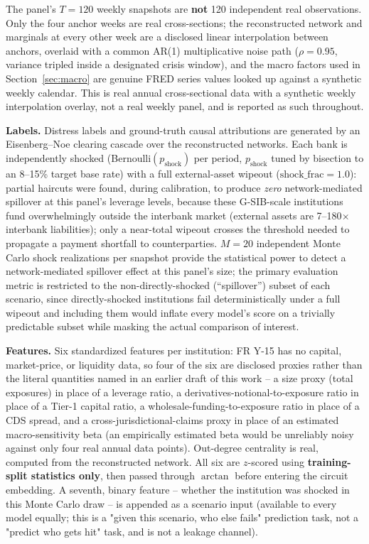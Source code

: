 \documentclass[journal]{IEEEtran}
\begin{document}
The panel's $T=120$ weekly snapshots are \textbf{not} 120 independent
real observations. Only the four anchor weeks are real cross-sections;
the reconstructed network and marginals at every other week are a
disclosed linear interpolation between anchors, overlaid with a common
AR(1) multiplicative noise path ($\rho=0.95$, variance tripled inside a
designated crisis window), and the macro factors used in
Section~\ref{sec:macro} are genuine FRED series values looked up against
a synthetic weekly calendar. This is real annual cross-sectional data
with a synthetic weekly interpolation overlay, not a real weekly panel,
and is reported as such throughout.

\textbf{Labels.} Distress labels and ground-truth causal attributions
are generated by an Eisenberg--Noe \cite{eisenberg2001} clearing cascade
over the reconstructed networks. Each bank is independently shocked
(Bernoulli$(p_{\mathrm{shock}})$ per period, $p_{\mathrm{shock}}$ tuned
by bisection to an 8--15\% target base rate) with a full external-asset
wipeout ($\mathrm{shock\_frac}=1.0$): partial haircuts were found, during
calibration, to produce \emph{zero} network-mediated spillover at this
panel's leverage levels, because these G-SIB-scale institutions fund
overwhelmingly outside the interbank market (external assets are
7--180$\times$ interbank liabilities); only a near-total wipeout crosses
the threshold needed to propagate a payment shortfall to counterparties.
$M=20$ independent Monte Carlo shock realizations per snapshot provide
the statistical power to detect a network-mediated spillover effect at
this panel's size; the primary evaluation metric is restricted to the
non-directly-shocked (``spillover'') subset of each scenario, since
directly-shocked institutions fail deterministically under a full
wipeout and including them would inflate every model's score on a
trivially predictable subset while masking the actual comparison of
interest.

\textbf{Features.} Six standardized features per institution: FR Y-15
has no capital, market-price, or liquidity data, so four of the six are
disclosed proxies rather than the literal quantities named in an earlier
draft of this work -- a size proxy (total exposures) in place of a
leverage ratio, a derivatives-notional-to-exposure ratio in place of a
Tier-1 capital ratio, a wholesale-funding-to-exposure ratio in place of a
CDS spread, and a cross-jurisdictional-claims proxy in place of an
estimated macro-sensitivity beta (an empirically estimated beta would be
unreliably noisy against only four real annual data points). Out-degree
centrality is real, computed from the reconstructed network. All six are
$z$-scored using \textbf{training-split statistics only}, then passed
through $\arctan$ before entering the circuit embedding. A seventh,
binary feature -- whether the institution was shocked in this Monte
Carlo draw -- is appended as a scenario input (available to every model
equally; this is a "given this scenario, who else fails" prediction
task, not a "predict who gets hit" task, and is not a leakage channel).
\end{document}
